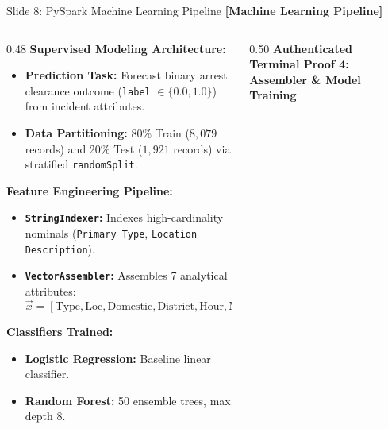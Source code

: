 \documentclass[aspectratio=169]{beamer}
\begin{document}
\begin{frame}{Slide 8: PySpark Machine Learning Pipeline \hfill \footnotesize\color{AmritaMaroon}\textbf{[Machine Learning Pipeline]}}
    \begin{columns}[T]
        \begin{column}{0.48\textwidth}
            \textbf{\textcolor{NavyBlue}{Supervised Modeling Architecture:}}
            \begin{itemize}\tiny
                \setlength{\itemsep}{2pt}
                \item \textbf{Prediction Task:} Forecast binary arrest clearance outcome (\texttt{label} $\in \{0.0, 1.0\}$) from incident attributes.
                \item \textbf{Data Partitioning:} 80\% Train ($8,079$ records) and 20\% Test ($1,921$ records) via stratified \texttt{randomSplit}.
            \end{itemize}
            \vspace{0.04cm}
            \textbf{\textcolor{NavyBlue}{Feature Engineering Pipeline:}}
            \begin{itemize}\tiny
                \setlength{\itemsep}{1.5pt}
                \item \textbf{\texttt{StringIndexer}:} Indexes high-cardinality nominals (\texttt{Primary Type}, \texttt{Location Description}).
                \item \textbf{\texttt{VectorAssembler}:} Assembles 7 analytical attributes:
                $$\vec{x} = [\text{Type}, \text{Loc}, \text{Domestic}, \text{District}, \text{Hour}, \text{Month}, \text{Weekend}]$$
            \end{itemize}
            \vspace{0.04cm}
            \textbf{\textcolor{NavyBlue}{Classifiers Trained:}}
            \begin{itemize}\tiny
                \item \textbf{Logistic Regression:} Baseline linear classifier.
                \item \textbf{Random Forest:} 50 ensemble trees, max depth 8.
            \end{itemize}
        \end{column}
        \begin{column}{0.50\textwidth}
            \centering
            {\scriptsize\textbf{\textcolor{NavyBlue}{Authenticated Terminal Proof 4: Assembler \& Model Training}}}\par

\end{column}
\end{columns}
\end{frame}
\end{document}
